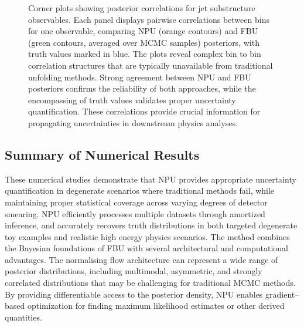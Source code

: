 \begin{figure}
\caption[Corner plots for jet substructure observables]{Corner plots showing posterior correlations for jet substructure observables.
Each panel displays pairwise correlations between bins for one observable, comparing NPU (orange contours) and FBU (green contours, averaged over MCMC samples) posteriors, with truth values marked in blue.
The plots reveal complex bin to bin correlation structures that are typically unavailable from traditional unfolding methods.
Strong agreement between NPU and FBU posteriors confirms the reliability of both approaches, while the encompassing of truth values validates proper uncertainty quantification.
These correlations provide crucial information for propagating uncertainties in downstream physics analyses.\footnotemark
}
\label{fig:phys-corner}
\end{figure}        
\subsection{Summary of Numerical Results}
    These numerical studies demonstrate that NPU provides appropriate uncertainty quantification in degenerate scenarios where traditional methods fail, while maintaining proper statistical coverage across varying degrees of detector smearing.
    NPU efficiently processes multiple datasets through amortized inference, and accurately recovers truth distributions in both targeted degenerate toy examples and realistic high energy physics scenarios.
    The method combines the Bayesian foundations of FBU with several architectural and computational advantages.
    The normalising flow architecture can represent a wide range of posterior distributions, including multimodal, asymmetric, and strongly correlated distributions that may be challenging for traditional MCMC methods.
    By providing differentiable access to the posterior density, NPU enables gradient--based optimization for finding maximum likelihood estimates or other derived quantities.

